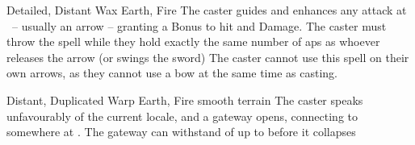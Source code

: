 \ifodd\value{diceNo}

  {Detailed, Distant}%
  {Wax}%
  {Earth, Fire}%
  {}%
  {The caster guides and enhances any attack at \spellRange\ -- usually an arrow -- granting a  Bonus to hit and Damage.
    The caster must throw the spell while they hold exactly the same number of \glspl{ap} as whoever releases the arrow (or swings the sword)}%
  {The caster cannot use this spell on their own arrows, as they cannot use a bow at the same time as casting.}

\else

  {Distant, Duplicated}%
  {Warp}%
  {Earth, Fire}%
  {smooth terrain}%
  {The caster speaks unfavourably of the current locale, and a gateway opens, connecting to somewhere at \spellRange.
  The gateway can withstand  of up to  before it collapses}%
  {}

\fi

